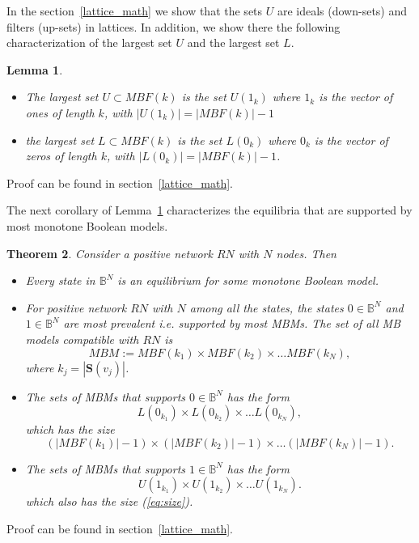\documentclass[10pt,letterpaper]{article}
\newcommand{\bbB}{\mathbb{B}}
\newcommand{\Sources}{\mathbf{S}}
\newcommand{\boolf}{{\mathfrak 0}}
\newcommand{\boolt}{{\mathfrak 1}}
\newtheorem{thm}{Theorem}[section]
\newtheorem{lem}[thm]{Lemma}
\begin{document}
In the section~\ref{lattice_math} we show that the sets $U$ are ideals (down-sets) and filters (up-sets) in lattices. In addition, we show there the following characterization of the largest set $U$ and the largest set $L$.

\begin{lem} \label{lem:big_UL}
\begin{itemize}
\item The largest set $U \subset MBF(k)$ is the set $U(\boolt_k)$ where $\boolt_k$ is the vector of ones of length $k$, with $|U(\boolt_k)| = |MBF(k)|-1$
\item the largest set $L \subset MBF(k)$ is the set $L(\boolf_k)$ where $\boolf_k$ is the vector of zeros of length $k$, with $|L(\boolf_k)| = |MBF(k)|-1$.
\end{itemize}
\end{lem}
Proof can be found in section~\ref{lattice_math}.

The next corollary of Lemma~\ref{lem:big_UL} characterizes the equilibria that are supported by most monotone Boolean models.

\begin{thm} \label{thm:most_common}
Consider a positive network $RN$ with $N$ nodes. Then 

\begin{itemize}
\item
Every state in $\bbB^N$ is an equilibrium for some monotone Boolean model.
\item For positive network $RN$ with $N$ among all the states, the states $\boolf \in \bbB^N$ and $\boolt \in \bbB^N$ are most prevalent i.e. supported by most MBMs.
The set of all MB models compatible with $RN$ is 
    \[ MBM:= MBF(k_1)\times MBF(k_2) \times \ldots MBF(k_N),\]
where $k_j=|\Sources(v_j)|$.
\item The sets of MBMs that supports $\boolf\in \bbB^N$ has the form 
    \[ L(\boolf_{k_1})\times L(\boolf_{k_2}) \times \ldots L(\boolf_{k_N}),\]
which has the size 
\begin{equation} \label{eq:size}
(|MBF(k_1)|-1)\times (|MBF(k_2)|-1) \times \ldots (|MBF(k_N)|-1).
\end{equation}
\item The sets of MBMs that supports $\boolt\in \bbB^N$ has the form 
    \[ U(\boolt_{k_1})\times U(\boolt_{k_2}) \times \ldots U(\boolt_{k_N}).\]
which also has the size (\ref{eq:size}).
\end{itemize}
\end{thm}
Proof can be found in section~\ref{lattice_math}.
\end{document}
